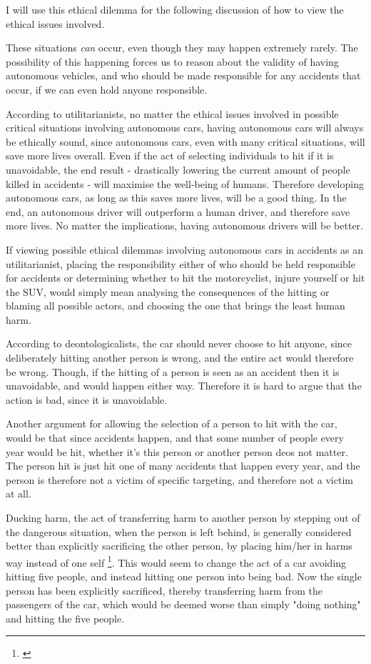 I will use this ethical dilemma for the following discussion of how to view the ethical issues involved. 

These situations \textit{can} occur, even though they may happen extremely rarely. The possibility of this happening forces us to reason about the validity of having autonomous vehicles, and who should be made responsible for any accidents that occur, if we can even hold anyone responsible. 

\newpar According to utilitarianists, no matter the ethical issues involved in possible critical situations involving autonomous cars, having autonomous cars will always be ethically sound, since autonomous cars, even with many critical situations, will save more lives overall. Even if the act of selecting individuals to hit if it is unavoidable, the end result - drastically lowering the current amount of people killed in accidents - will maximise the well-being of humans. Therefore developing autonomous cars, as long as this saves more lives, will be a good thing. In the end, an autonomous driver will outperform a human driver, and therefore save more lives. No matter the implications, having autonomous drivers will be better. 

If viewing possible ethical dilemmas involving autonomous cars in accidents as an utilitarianist, placing the responsibility either of who should be held responsible for accidents or determining whether to hit the motorcyclist, injure yourself or hit the SUV, would simply mean analysing the consequences of the hitting or blaming all possible actors, and choosing the one that brings the least human harm.

\newpar According to deontologicalists, the car should never choose to hit anyone, since deliberately hitting another person is wrong, and the entire act would therefore be wrong. Though, if the hitting of a person is seen as an accident then it is unavoidable, and would happen either way. Therefore it is hard to argue that the action is bad, since it is unavoidable.  

\newpar Another argument for allowing the selection of a person to hit with the car, would be that since accidents happen, and that some number of people every year would be hit, whether it's this person or another person deos not matter. The person hit is just hit one of many accidents that happen every year, and the person is therefore not a victim of specific targeting, and therefore not a victim at all.

\newpar Ducking harm, the act of transferring harm to another person by stepping out of the dangerous situation, when the person is left behind, is generally considered better than explicitly sacrificing the other person, by placing him/her in harms way instead of one self \footnote{\cite{10.2307/2027067}}.
This would seem to change the act of a car avoiding hitting five people, and instead hitting one person into being bad. Now the single person has been explicitly sacrificed, thereby transferring harm from the passengers of the car, which would be deemed worse than simply "doing nothing" and hitting the five people. 

